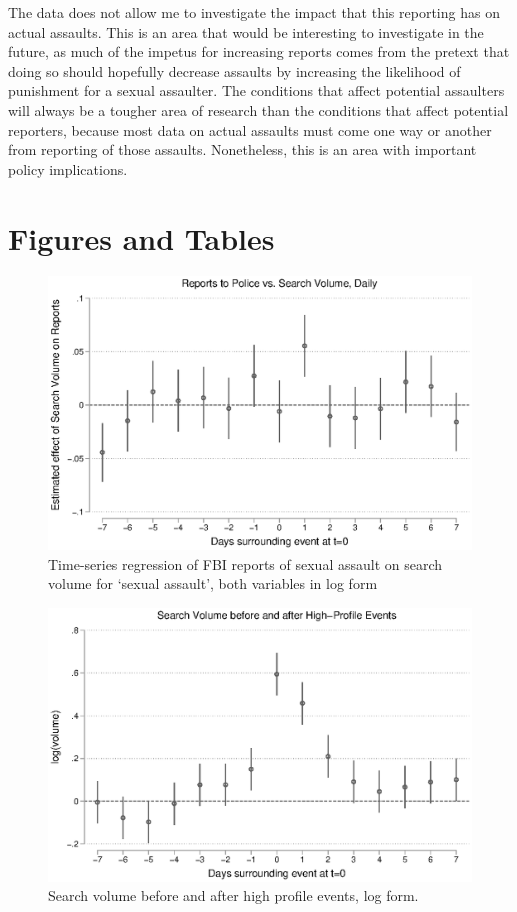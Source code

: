 \documentclass[AER,draftmode]{AEA}
\begin{document}
The data does not allow me to investigate the impact that this reporting has on actual assaults. This is an area that would be interesting to investigate in the future, as much of the impetus for increasing reports comes from the pretext that doing so should hopefully decrease assaults by increasing the likelihood of punishment for a sexual assaulter. The conditions that affect potential assaulters will always be a tougher area of research than the conditions that affect potential reporters, because most data on actual assaults must come one way or another from reporting of those assaults. Nonetheless, this is an area with important policy implications.


\clearpage
\section{Figures and Tables}

\begin{figure}
\includegraphics[width=\linewidth]{figures/police_trend_daily_logboth.eps}
\caption{Time-series regression of FBI reports of sexual assault on search volume for `sexual assault', both variables in log form} \label{figure:police_trends_daily_logboth}
\end{figure}

\begin{figure}
\includegraphics[width=\linewidth]{figures/events_trend.eps}
\caption{Search volume before and after high profile events, log form.} \label{figure:events_trend}
\end{figure}
\end{document}
